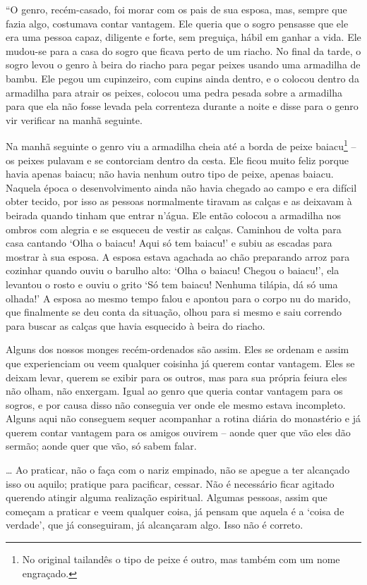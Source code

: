 ``O genro, recém-casado, foi morar com os pais de sua esposa, mas,
sempre que fazia algo, costumava contar vantagem. Ele queria que o sogro
pensasse que ele era uma pessoa capaz, diligente e forte, sem preguiça,
hábil em ganhar a vida. Ele mudou-se para a casa do sogro que ficava
perto de um riacho. No final da tarde, o sogro levou o genro à beira do
riacho para pegar peixes usando uma armadilha de bambu. Ele pegou um
cupinzeiro, com cupins ainda dentro, e o colocou dentro da armadilha
para atrair os peixes, colocou uma pedra pesada sobre a armadilha para
que ela não fosse levada pela correnteza durante a noite e disse para o
genro vir verificar na manhã seguinte.

Na manhã seguinte o genro viu a armadilha cheia até a borda de peixe
baiacu\footnote{No original tailandês o tipo de peixe é outro, mas
  também com um nome engraçado.} -- os peixes pulavam e se contorciam
dentro da cesta. Ele ficou muito feliz porque havia apenas baiacu; não
havia nenhum outro tipo de peixe, apenas baiacu. Naquela época o
desenvolvimento ainda não havia chegado ao campo e era difícil obter
tecido, por isso as pessoas normalmente tiravam as calças e as deixavam
à beirada quando tinham que entrar n'água. Ele então colocou a armadilha
nos ombros com alegria e se esqueceu de vestir as calças. Caminhou de
volta para casa cantando `Olha o baiacu! Aqui só tem baiacu!' e subiu as
escadas para mostrar à sua esposa. A esposa estava agachada ao chão
preparando arroz para cozinhar quando ouviu o barulho alto: `Olha o
baiacu! Chegou o baiacu!', ela levantou o rosto e ouviu o grito `Só tem
baiacu! Nenhuma tilápia, dá só uma olhada!' A esposa ao mesmo tempo
falou e apontou para o corpo nu do marido, que finalmente se deu conta
da situação, olhou para si mesmo e saiu correndo para buscar as calças
que havia esquecido à beira do riacho.

Alguns dos nossos monges recém-ordenados são assim. Eles se ordenam e
assim que experienciam ou veem qualquer coisinha já querem contar
vantagem. Eles se deixam levar, querem se exibir para os outros, mas
para sua própria feiura eles não olham, não enxergam. Igual ao genro que
queria contar vantagem para os sogros, e por causa disso não conseguia
ver onde ele mesmo estava incompleto. Alguns aqui não conseguem sequer
acompanhar a rotina diária do monastério e já querem contar vantagem
para os amigos ouvirem -- aonde quer que vão eles dão sermão; aonde quer
que vão, só sabem falar.

\ldots{} Ao praticar, não o faça com o nariz empinado, não se apegue a
ter alcançado isso ou aquilo; pratique para pacificar, cessar. Não é
necessário ficar agitado querendo atingir alguma realização espiritual.
Algumas pessoas, assim que começam a praticar e veem qualquer coisa, já
pensam que aquela é a `coisa de verdade', que já conseguiram, já
alcançaram algo. Isso não é correto.

